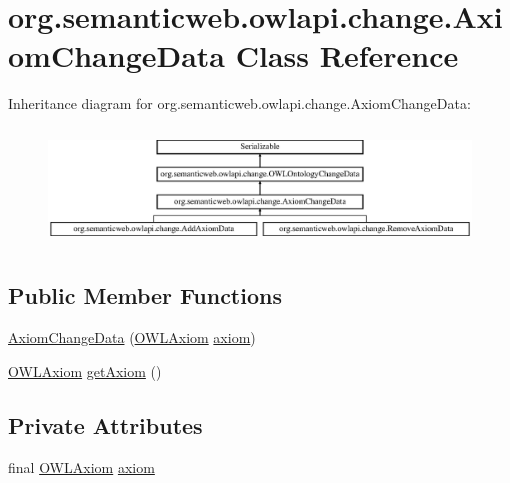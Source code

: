 \hypertarget{classorg_1_1semanticweb_1_1owlapi_1_1change_1_1_axiom_change_data}{\section{org.\-semanticweb.\-owlapi.\-change.\-Axiom\-Change\-Data Class Reference}
\label{classorg_1_1semanticweb_1_1owlapi_1_1change_1_1_axiom_change_data}
}
Inheritance diagram for org.\-semanticweb.\-owlapi.\-change.\-Axiom\-Change\-Data\-:\begin{figure}[H]
\begin{center}
\leavevmode
\includegraphics[height=3.163842cm]{classorg_1_1semanticweb_1_1owlapi_1_1change_1_1_axiom_change_data}
\end{center}
\end{figure}
\subsection*{Public Member Functions}
\begin{DoxyCompactItemize}
\item 
\hyperlink{classorg_1_1semanticweb_1_1owlapi_1_1change_1_1_axiom_change_data_ac86a9e80327bab6a691318490d7e1b72}{Axiom\-Change\-Data} (\hyperlink{interfaceorg_1_1semanticweb_1_1owlapi_1_1model_1_1_o_w_l_axiom}{O\-W\-L\-Axiom} \hyperlink{classorg_1_1semanticweb_1_1owlapi_1_1change_1_1_axiom_change_data_acecb42f3fae836ede3fc37f8c4feb4e4}{axiom})
\item 
\hyperlink{interfaceorg_1_1semanticweb_1_1owlapi_1_1model_1_1_o_w_l_axiom}{O\-W\-L\-Axiom} \hyperlink{classorg_1_1semanticweb_1_1owlapi_1_1change_1_1_axiom_change_data_acdb2b1c963d0d1fc2921f7ee54b1fbe2}{get\-Axiom} ()
\end{DoxyCompactItemize}
\subsection*{Private Attributes}
\begin{DoxyCompactItemize}
\item 
final \hyperlink{interfaceorg_1_1semanticweb_1_1owlapi_1_1model_1_1_o_w_l_axiom}{O\-W\-L\-Axiom} \hyperlink{classorg_1_1semanticweb_1_1owlapi_1_1change_1_1_axiom_change_data_acecb42f3fae836ede3fc37f8c4feb4e4}{axiom}
\end{DoxyCompactItemize}
